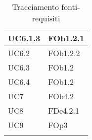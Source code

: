 \begin{longtable}{|l|p{4cm}|}
\hline
		UC6.1.3 & FOb1.2.1 \linebreak   \\
\hline
		UC6.2 & FOb1.2.2 \linebreak   \\
\hline
		UC6.3 & FOb1.2 \linebreak   \\
\hline
		UC6.4 & FOb1.2 \linebreak   \\
\hline
		UC7 & FOb4.2 \linebreak   \\
\hline
		UC8 & FDe4.2.1 \linebreak   \\
\hline
		UC9 & FOp3 \linebreak   \\
\hline
\caption{Tracciamento fonti-requisiti}
\end{longtable}